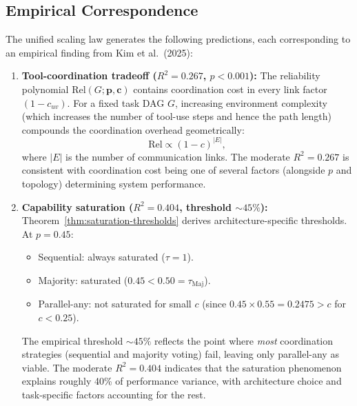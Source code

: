 \subsection{Empirical Correspondence}
\label{subsec:empirical}

\begin{theorem}
\label{thm:empirical-correspondence}
The unified scaling law generates the following predictions, each corresponding to
an empirical finding from Kim et al.\ (2025):

\begin{enumerate}
  \item \textbf{Tool-coordination tradeoff ($R^2 = 0.267$, $p < 0.001$):}
  The reliability polynomial $\mathrm{Rel}(G; \mathbf{p}, \mathbf{c})$ contains
  coordination cost in every link factor $(1-c_{uv})$. For a fixed task DAG $G$,
  increasing environment complexity (which increases the number of tool-use steps
  and hence the path length) compounds the coordination overhead geometrically:
  \[
    \mathrm{Rel} \propto (1-c)^{|E|},
  \]
  where $|E|$ is the number of communication links. The moderate $R^2 = 0.267$
  is consistent with coordination cost being one of several factors (alongside
  $p$ and topology) determining system performance.

  \item \textbf{Capability saturation ($R^2 = 0.404$, threshold $\sim 45\%$):}
  Theorem~\ref{thm:saturation-thresholds} derives architecture-specific
  thresholds. At $p = 0.45$:
  \begin{itemize}
    \item Sequential: always saturated ($\tau = 1$).
    \item Majority: saturated ($0.45 < 0.50 = \tau_{\mathrm{Maj}}$).
    \item Parallel-any: not saturated for small $c$ (since
      $0.45 \times 0.55 = 0.2475 > c$ for $c < 0.25$).
  \end{itemize}
  The empirical threshold $\sim 45\%$ reflects the point where \emph{most}
  coordination strategies (sequential and majority voting) fail, leaving only
  parallel-any as viable. The moderate $R^2 = 0.404$ indicates that the
  saturation phenomenon explains roughly 40\% of performance variance, with
  architecture choice and task-specific factors accounting for the rest.


\end{enumerate}
\end{theorem}
